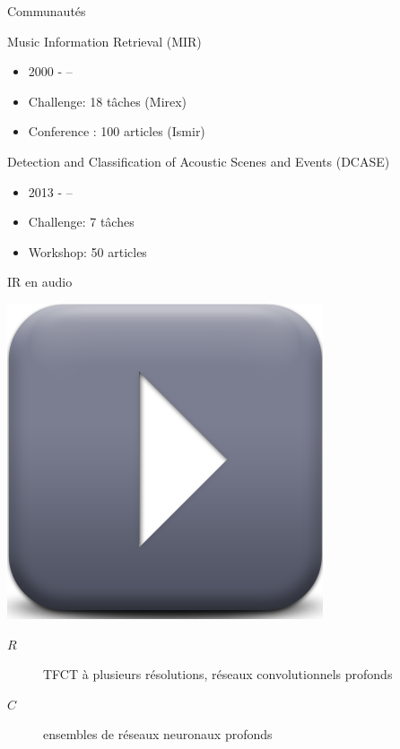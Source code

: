 \begin{frame}{Communautés}
\begin{block}{Music Information Retrieval (MIR)}
\begin{itemize}
\item 2000 - --
\item Challenge: 18 tâches  (Mirex)
\item Conference : 100 articles (Ismir)
\end{itemize}
\end{block}
\begin{block}{Detection and Classification of
Acoustic Scenes and Events (DCASE)}
\begin{itemize}
\item 2013 - --
\item Challenge: 7 tâches
\item Workshop: 50 articles
\end{itemize}
\end{block}
\end{frame}


\begin{frame}{IR en audio}
\begin{center}
\includegraphics[width=.3\columnwidth]{figures/play}
\end{center}
\begin{description}
\item[$R$] TFCT à plusieurs résolutions, réseaux convolutionnels profonds
\item[$C$] ensembles de réseaux neuronaux profonds 
\end{description}
\end{frame}


